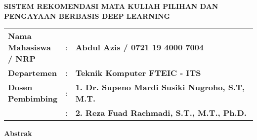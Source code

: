 {
\begin{center}
    \uppercase{\textbf{\large Sistem rekomendasi Mata Kuliah Pilihan dan Pengayaan berbasis Deep Learning}}
\end{center}

\vspace*{6 mm}
\begin{adjustwidth}{}{}
    \begin{tabular}{lcp{1\linewidth}}
        \noindent\textbf{Nama Mahasiswa / NRP} & : & \textbf{Abdul Azis / 0721 19 4000 7004}                \\
        \noindent\textbf{Departemen}           & : & \textbf{Teknik Komputer FTEIC - ITS}                   \\
        \noindent\textbf{Dosen Pembimbing}     & : & \textbf{1. Dr. Supeno Mardi Susiki Nugroho, S.T, M.T.} \\
                                               & : & \textbf{2. Reza Fuad Rachmadi, S.T., M.T., Ph.D.}      \\
    \end{tabular}
\end{adjustwidth}

\vspace{6 mm}
\noindent
\textbf{Abstrak}
\vspace{3 mm}

}
